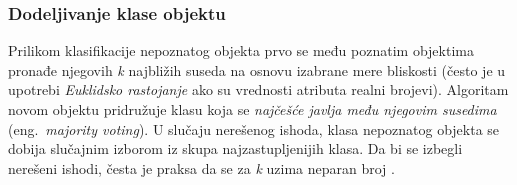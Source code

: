 \documentclass[12pt,oneside]{memoir}
\begin{document}



\subsubsection{Dodeljivanje klase objektu}
Prilikom klasifikacije nepoznatog objekta prvo se među poznatim objektima pronađe njegovih \textit{k} najbližih suseda na osnovu izabrane mere bliskosti (često je u upotrebi \textit{Euklidsko rastojanje} ako su vrednosti atributa realni brojevi). %
Algoritam novom objektu pridružuje klasu koja se \textit{najčešće javlja među njegovim susedima} (eng.~\textit{majority voting}). U slučaju nerešenog ishoda, klasa nepoznatog objekta se dobija slučajnim izborom iz skupa najzastupljenijih klasa. Da bi se izbegli nerešeni ishodi, česta je praksa da se za \textit{k} uzima neparan broj \cite{mitic, mladen, mlm}.%
\par
\end{document}
